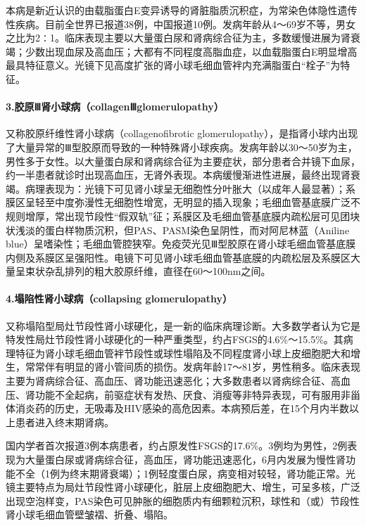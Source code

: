 本病是新近认识的由载脂蛋白E变异诱导的肾脏脂质沉积症，为常染色体隐性遗传性疾病。目前全世界已报道38例，中国报道10例。发病年龄从4～69岁不等，男女之比为2∶1。临床表现主要以大量蛋白尿和肾病综合征为主，多数缓慢进展为肾衰竭；少数出现血尿及高血压；大都有不同程度高脂血症，以血载脂蛋白E明显增高最具特征意义。光镜下见高度扩张的肾小球毛细血管袢内充满脂蛋白“栓子”为特征。

\paragraph{3.胶原Ⅲ肾小球病（collagenⅢglomerulopathy）}

又称胶原纤维性肾小球病（collagenofibrotic
glomerulopathy），是指肾小球内出现了大量异常的Ⅲ型胶原而导致的一种特殊肾小球疾病。发病年龄以30～50岁为主，男性多于女性。以大量蛋白尿和肾病综合征为主要症状，部分患者合并镜下血尿，约一半患者就诊时出现高血压，无肾外表现。本病缓慢渐进性进展，最终出现肾衰竭。病理表现为：光镜下可见肾小球呈无细胞性分叶胀大（以成年人最显著）；系膜区呈轻至中度弥漫性无细胞性增宽，无明显的插入现象；毛细血管基底膜广泛不规则增厚，常出现节段性“假双轨”征；系膜区及毛细血管基底膜内疏松层可见团块状浅淡的蛋白样物质沉积，但PAS、PASM染色呈阴性，而对阿尼林蓝（Aniline
blue）呈嗜染性；毛细血管腔狭窄。免疫荧光见Ⅲ型胶原在肾小球毛细血管基底膜内侧及系膜区呈强阳性。电镜下可见肾小球毛细血管基底膜的内疏松层及系膜区大量呈束状杂乱排列的粗大胶原纤维，直径在60～100nm之间。

\paragraph{4.塌陷性肾小球病（collapsing glomerulopathy）}

又称塌陷型局灶节段性肾小球硬化，是一新的临床病理诊断。大多数学者认为它是特发性局灶节段性肾小球硬化的一种严重类型，约占FSGS的4.6\%～15.5\%。其病理特征为肾小球毛细血管袢节段性或球性塌陷及不同程度肾小球上皮细胞肥大和增生，常常伴有明显的肾小管间质的损伤。发病年龄17～81岁，男性稍多。临床表现主要为肾病综合征、高血压、肾功能迅速恶化；大多数患者以肾病综合征、高血压、肾功能不全起病，前驱症状有发热、厌食、消瘦等非特异表现，可有服用非甾体消炎药的历史，无吸毒及HIV感染的高危因素。本病预后差，在15个月内半数以上患者进入终末期肾病。

国内学者首次报道3例本病患者，约占原发性FSGS的17.6\%。3例均为男性，2例表现为大量蛋白尿或肾病综合征，高血压，肾功能迅速恶化，6月内发展为慢性肾功能不全（1例为终末期肾衰竭）；1例轻度蛋白尿，病变相对较轻，肾功能正常。光镜主要特点为局灶节段性肾小球硬化，脏层上皮细胞肥大、增生，可呈多核，广泛出现空泡样变，PAS染色可见肿胀的细胞质内有细颗粒沉积，球性和（或）节段性肾小球毛细血管壁皱褶、折叠、塌陷。

